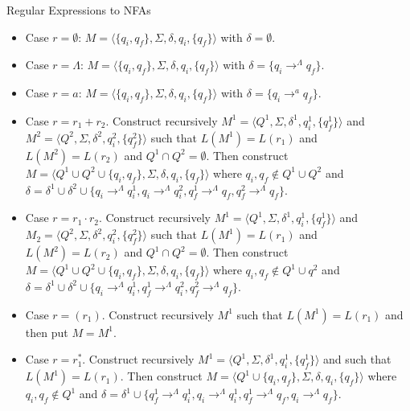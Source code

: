 \documentclass{beamer}
\begin{document}
\begin{frame}[allowframebreaks]{Regular Expressions to NFAs}
\begin{itemize}
  \item Case $r=\emptyset$: $M=\langle \{q_i,q_f\},\Sigma,\delta,q_i,\{q_f\}\rangle$ 
  	with $\delta=\emptyset$.
  \item Case $r=\Lambda$: $M=\langle \{q_i,q_f\},\Sigma,\delta,q_i,\{q_f\}\rangle$ 
  	with $\delta = \{q_i\longrightarrow^\Lambda q_f\}$. 
  \item Case $r=a$: $M=\langle \{q_i,q_f\},\Sigma,\delta,q_i,\{q_f\}\rangle$ 
  	with $\delta = \{q_i\longrightarrow^a q_f\}$. 
  \item Case $r=r_1+r_2$. Construct recursively $M^1=\langle Q^1,\Sigma, \delta^1,q_i^1, \{q_f^1\}\rangle$ and 
         $M^2=\langle Q^2,\Sigma, \delta^2,q_i^2, \{q_f^2\}\rangle$ such that 
         $L(M^1)=L(r_1)$ and $L(M^2)=L(r_2)$ and $Q^1\cap Q^2=\emptyset$. Then 
         construct $M=\langle Q^1\cup Q^2\cup\{q_i,q_f\},\Sigma, \delta,q_i, \{q_f\}\rangle$ 
        where $q_i,q_f\not\in  Q^1\cup Q^2$
        and $\delta=\delta^1\cup\delta^2\cup\{q_i\longrightarrow^\Lambda q_i^1, q_i\longrightarrow^\Lambda q_i^2, 
        q_f^1\longrightarrow^\Lambda q_f, q_f^2\longrightarrow^\Lambda q_f\}$. 
     \item Case $r=r_1\cdot r_2$. Construct recursively $M^1=\langle Q^1,\Sigma, \delta^1,q_i^1, \{q_f^1\}\rangle$ and 
         $M_2=\langle Q^2,\Sigma, \delta^2,q_i^2, \{q_f^2\}\rangle$ such that 
         $L(M^1)=L(r_1)$ and $L(M^2)=L(r_2)$ and $Q^1\cap Q^2=\emptyset$. 
        Then construct $M=\langle Q^1\cup Q^2\cup\{q_i,q_f\},\Sigma, \delta,q_i, \{q_f\}\rangle$ 
        where $q_i,q_f\not\in  Q^1\cup q^2$
        and $\delta=\delta^1\cup\delta^2\cup\{q_i\longrightarrow^\Lambda q_i^1,  
        q_f^1 \longrightarrow^\Lambda q_i^2, q_f^2\longrightarrow^\Lambda q_f\}$.  
     \item Case $r=(r_1)$. Construct recursively $M^1$ such that $L(M^1)=L(r_1)$ and then put $M=M^1$.
     \item Case $r=r_1^*$.  Construct recursively $M^1=\langle Q^1,\Sigma, \delta^1,q_i^1, \{q_f^1\}\rangle$ and 
         such that 
         $L(M^1)=L(r_1)$. Then 
         construct $M=\langle Q^1\cup\{q_i,q_f\},\Sigma, \delta,q_i, \{q_f\}\rangle$ 
        where $q_i,q_f\not\in  Q^1$
        and $\delta=\delta^1\cup\{ q_f^1 \longrightarrow^\Lambda q_i^1, 
        q_i\longrightarrow^\Lambda q_i^1,  
        q_f^1\longrightarrow^\Lambda q_f, q_i \longrightarrow^\Lambda q_f\}$.    
\end{itemize}




\end{frame}
\end{document}
